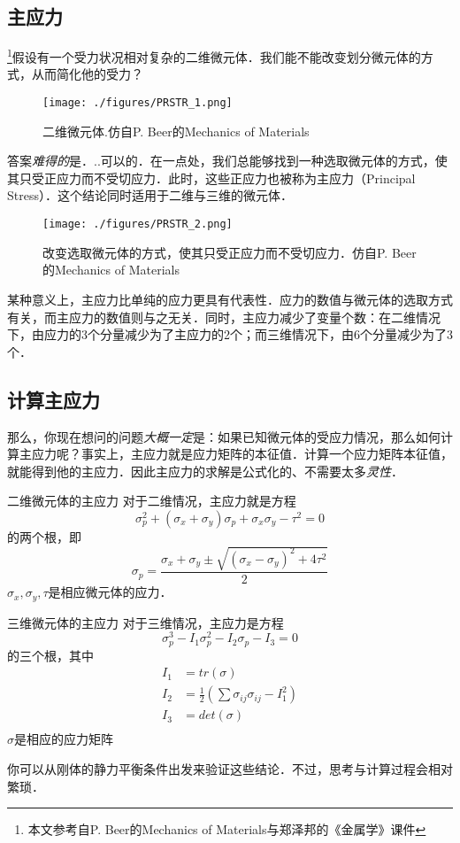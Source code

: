 

\subsection{主应力}
\footnote{本文参考自P. Beer的Mechanics of Materials与郑泽邦的《金属学》课件}假设有一个受力状况相对复杂的二维微元体．我们能不能改变划分微元体的方式，从而简化他的受力？
\begin{figure}[ht]
\centering
\texttt{[image: ./figures/PRSTR\_1.png]}
\caption{二维微元体.仿自P. Beer的Mechanics of Materials} \label{PRSTR_fig1}
\end{figure}

答案\textsl{难得的}是．..可以的．在一点处，我们总能够找到一种选取微元体的方式，使其只受正应力而不受切应力．此时，这些正应力也被称为主应力（Principal Stress）．这个结论同时适用于二维与三维的微元体．
\begin{figure}[ht]
\centering
\texttt{[image: ./figures/PRSTR\_2.png]}
\caption{改变选取微元体的方式，使其只受正应力而不受切应力．仿自P. Beer的Mechanics of Materials} \label{PRSTR_fig2}
\end{figure}

某种意义上，主应力比单纯的应力更具有代表性．应力的数值与微元体的选取方式有关，而主应力的数值则与之无关．同时，主应力减少了变量个数：在二维情况下，由应力的3个分量减少为了主应力的2个；而三维情况下，由6个分量减少为了3个．

\subsection{计算主应力}

那么，你现在想问的问题\textsl{大概一定}是：如果已知微元体的受应力情况，那么如何计算主应力呢？事实上，主应力就是应力矩阵的本征值．计算一个应力矩阵本征值，就能得到他的主应力．因此主应力的求解是公式化的、不需要太多\textsl{灵性}．

\begin{example}{二维微元体的主应力}
对于二维情况，主应力就是方程
$$\sigma_p^2+(\sigma_x+\sigma_y)\sigma_p+\sigma_x\sigma_y-\tau^2=0$$
的两个根，即
$$\sigma_p=\frac{\sigma_x+\sigma_y \pm \sqrt{(\sigma_x-\sigma_y)^2+4\tau^2}}{2}$$
$\sigma_x,\sigma_y,\tau$是相应微元体的应力．
\end{example}

\begin{example}{三维微元体的主应力}
对于三维情况，主应力是方程 
$$
\sigma_p^3-I_1\sigma_p^2-I_2\sigma_p-I_3=0
$$
的三个根，其中
$$
\begin{aligned}
I_1&=tr(\sigma)\\
I_2&=\frac{1}{2} ({\sum \sigma_{ij} \sigma_{ij} -I_1^2})\\
I_3&=det(\sigma)\\
\end{aligned}
$$
$\sigma$是相应的应力矩阵
\end{example}
你可以从刚体的静力平衡条件出发来验证这些结论．不过，思考与计算过程会相对繁琐．

